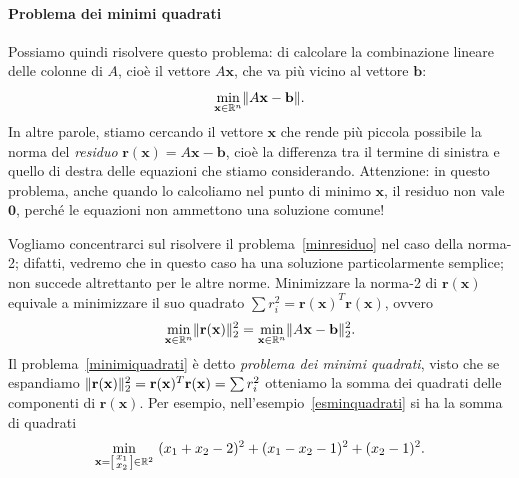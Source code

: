 \documentclass[a4paper]{report}
\DeclarePairedDelimiter{\norm}{\lVert}{\rVert}
\theoremstyle{definition}
\theoremstyle{remark}
\newcommand{\x}{\mathbf{x}}
\renewcommand{\b}{\mathbf{b}}
\begin{document}
\paragraph{Problema dei minimi quadrati} Possiamo quindi risolvere questo problema: di calcolare la combinazione lineare delle colonne di $A$, cioè il vettore $A\x$, che va più vicino al vettore $\b$:
\begin{equation} \label{minresiduo}
    \min_{\x\in\mathbb{R}^n} \norm{A\x-\b}.    
\end{equation}
In altre parole, stiamo cercando il vettore $\x$ che rende più piccola possibile la norma del \emph{residuo} $\mathbf{r}(\x) = A \x - \b$, cioè la differenza tra il termine di sinistra e quello di destra delle equazioni che stiamo considerando. Attenzione: in questo problema, anche quando lo calcoliamo nel punto di minimo $\x$, il residuo non vale $\mathbf{0}$, perché le equazioni non ammettono una soluzione comune!

Vogliamo concentrarci sul risolvere il problema~\eqref{minresiduo} nel caso della norma-2; difatti, vedremo che in questo caso ha una soluzione particolarmente semplice; non succede altrettanto per le altre norme. Minimizzare la norma-2 di $\mathbf{r}(\x)$ equivale a minimizzare il suo quadrato $\sum r_i^2  = \mathbf{r}(\x)^T\mathbf{r}(\x)$, ovvero
\begin{equation} \label{minimiquadrati}
    \min_{\x\in\mathbb{R}^n} \norm{\mathbf{r}(\x)}_2^2 = \min_{\x\in\mathbb{R}^n} \norm{A\x-\b}_2^2.
\end{equation}
Il problema~\eqref{minimiquadrati} è detto \emph{problema dei minimi quadrati}, visto che se espandiamo $\norm{\mathbf{r}(\x)}_2^2 = \mathbf{r}(\x)^T\mathbf{r}(\x) = \sum r_i^2$ otteniamo la somma dei quadrati delle componenti di $\mathbf{r}(\x)$. Per esempio, nell'esempio~\eqref{esminquadrati} si ha la somma di quadrati
\[
\min_{\x = \begin{bsmallmatrix}x_1\\x_2\end{bsmallmatrix} \in \mathbb{R}^2}\,\, (x_1 + x_2 - 2)^2 + (x_1 - x_2 - 1)^2 + (x_2 - 1)^2.
\]
\end{document}
